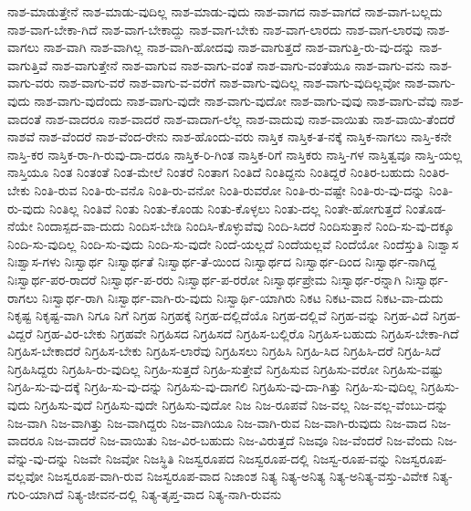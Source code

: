 {ನಾಶ-ಮಾಡುತ್ತೇನೆ
ನಾಶ-ಮಾಡು-ವುದಿಲ್ಲ
ನಾಶ-ಮಾಡು-ವುದು
ನಾಶ-ವಾಗದ
ನಾಶ-ವಾಗದೆ
ನಾಶ-ವಾಗ-ಬಲ್ಲದು
ನಾಶ-ವಾಗ-ಬೇಕಾ-ಗಿದೆ
ನಾಶ-ವಾಗ-ಬೇಕಾದ್ದು
ನಾಶ-ವಾಗ-ಬೇಕು
ನಾಶ-ವಾಗ-ಲಾರದು
ನಾಶ-ವಾಗ-ಲಾರವು
ನಾಶ-ವಾಗಲು
ನಾಶ-ವಾಗಿ
ನಾಶ-ವಾಗಿಲ್ಲ
ನಾಶ-ವಾಗಿ-ಹೋದವು
ನಾಶ-ವಾಗುತ್ತದೆ
ನಾಶ-ವಾಗುತ್ತಿ-ರು-ವು-ದನ್ನು
ನಾಶ-ವಾಗುತ್ತಿವೆ
ನಾಶ-ವಾಗುತ್ತೇನೆ
ನಾಶ-ವಾಗುವ
ನಾಶ-ವಾಗು-ವಂತೆ
ನಾಶ-ವಾಗು-ವಂತೆಯೂ
ನಾಶ-ವಾಗು-ವನು
ನಾಶ-ವಾಗು-ವರು
ನಾಶ-ವಾಗು-ವರೆ
ನಾಶ-ವಾಗು-ವ-ವರೆಗೆ
ನಾಶ-ವಾಗು-ವುದಿಲ್ಲ
ನಾಶ-ವಾಗು-ವುದಿಲ್ಲವೋ
ನಾಶ-ವಾಗು-ವುದು
ನಾಶ-ವಾಗು-ವುದೆಂದು
ನಾಶ-ವಾಗು-ವುದೇ
ನಾಶ-ವಾಗು-ವುದೋ
ನಾಶ-ವಾಗು-ವುವು
ನಾಶ-ವಾಗು-ವೆವು
ನಾಶ-ವಾದಂತೆ
ನಾಶ-ವಾದರೂ
ನಾಶ-ವಾದರೆ
ನಾಶ-ವಾದಾಗ-ಲೆಲ್ಲ
ನಾಶ-ವಾದುವು
ನಾಶ-ವಾಯಿತು
ನಾಶ-ವಾಯಿ-ತೆಂದರೆ
ನಾಶವೆ
ನಾಶ-ವೆಂದರೆ
ನಾಶ-ವೆಂದ-ರೇನು
ನಾಶ-ಹೊಂದು-ವರು
ನಾಸ್ತಿಕ
ನಾಸ್ತಿಕ-ತ-ನಕ್ಕೆ
ನಾಸ್ತಿಕ-ನಾಗಲು
ನಾಸ್ತಿ-ಕನೇ
ನಾಸ್ತಿ-ಕರ
ನಾಸ್ತಿಕ-ರಾ-ಗಿ-ರುವು-ದಾ-ದರೂ
ನಾಸ್ತಿಕ-ರಿ-ಗಿಂತ
ನಾಸ್ತಿಕ-ರಿಗೆ
ನಾಸ್ತಿಕರು
ನಾಸ್ತಿ-ಗಳ
ನಾಸ್ತಿತ್ವವೂ
ನಾಸ್ತಿ-ಯಲ್ಲ
ನಾಸ್ತಿಯೂ
ನಿಂತ
ನಿಂತಂತೆ
ನಿಂತ-ಮೇಲೆ
ನಿಂತರೆ
ನಿಂತಾಗ
ನಿಂತಿದೆ
ನಿಂತಿದ್ದನು
ನಿಂತಿದ್ದರೆ
ನಿಂತಿರ-ಬಹುದು
ನಿಂತಿರ-ಬೇಕು
ನಿಂತಿ-ರುವ
ನಿಂತಿ-ರು-ವನೊ
ನಿಂತಿ-ರು-ವನೋ
ನಿಂತಿ-ರುವರೋ
ನಿಂತಿ-ರು-ವಷ್ಟೇ
ನಿಂತಿ-ರು-ವು-ದನ್ನು
ನಿಂತಿ-ರು-ವುದು
ನಿಂತಿಲ್ಲ
ನಿಂತಿವೆ
ನಿಂತು
ನಿಂತು-ಕೊಂಡು
ನಿಂತು-ಕೊಳ್ಳಲು
ನಿಂತು-ದಲ್ಲ
ನಿಂತೇ-ಹೋಗುತ್ತದೆ
ನಿಂತೊಡ-ನೆಯೇ
ನಿಂದಾಸ್ಪದ-ವಾ-ದುದು
ನಿಂದಿಸ-ಬೇಡಿ
ನಿಂದಿಸಿ-ಕೊಳ್ಳುವೆವು
ನಿಂದಿ-ಸಿದರೆ
ನಿಂದಿಸುತ್ತಾನೆ
ನಿಂದಿ-ಸು-ವು-ದಕ್ಕೂ
ನಿಂದಿ-ಸು-ವುದಿಲ್ಲ
ನಿಂದಿ-ಸು-ವುದು
ನಿಂದಿ-ಸು-ವುದೇ
ನಿಂದೆ-ಯಲ್ಲದೆ
ನಿಂದೆಯಲ್ಲವೆ
ನಿಂದೆಯೋ
ನಿಂದೆಸ್ತುತಿ
ನಿಃಶ್ವಾಸ
ನಿಃಶ್ವಾಸ-ಗಳು
ನಿಃಸ್ವಾರ್ಥ
ನಿಃಸ್ವಾರ್ಥತೆ
ನಿಃಸ್ವಾರ್ಥ-ತೆ-ಯಿಂದ
ನಿಃಸ್ವಾರ್ಥದ
ನಿಃಸ್ವಾರ್ಥ-ದಿಂದ
ನಿಃಸ್ವಾರ್ಥ-ನಾಗಿದ್ದ
ನಿಃಸ್ವಾರ್ಥ-ಪರ-ರಾದರೆ
ನಿಃಸ್ವಾರ್ಥ-ಪ-ರರು
ನಿಃಸ್ವಾರ್ಥ-ಪ-ರರೋ
ನಿಃಸ್ವಾರ್ಥಪ್ರೇಮ
ನಿಃಸ್ವಾರ್ಥ-ರನ್ನಾಗಿ
ನಿಃಸ್ವಾರ್ಥ-ರಾಗಲು
ನಿಃಸ್ವಾರ್ಥ-ರಾಗಿ
ನಿಃಸ್ವಾರ್ಥ-ವಾಗಿ-ರು-ವುದು
ನಿಃಸ್ವಾರ್ಥಿ-ಯಾಗಿರು
ನಿಕಟ
ನಿಕಟ-ವಾದ
ನಿಕಟ-ವಾ-ದುದು
ನಿಕೃಷ್ಟ
ನಿಕೃಷ್ಟ-ವಾಗಿ
ನಿಗೂ
ನಿಗೆ
ನಿಗ್ರಹ
ನಿಗ್ರಹಕ್ಕೆ
ನಿಗ್ರಹ-ದಲ್ಲಿದೆಯೊ
ನಿಗ್ರಹ-ದಲ್ಲಿವೆ
ನಿಗ್ರಹ-ವನ್ನು
ನಿಗ್ರಹ-ವಿದೆ
ನಿಗ್ರಹ-ವಿದ್ದರೆ
ನಿಗ್ರಹ-ವಿರ-ಬೇಕು
ನಿಗ್ರಹವೇ
ನಿಗ್ರಹಿಸದ
ನಿಗ್ರಹಿಸದೆ
ನಿಗ್ರಹಿಸ-ಬಲ್ಲಿರೊ
ನಿಗ್ರಹಿಸ-ಬಹುದು
ನಿಗ್ರಹಿಸ-ಬೇಕಾ-ಗಿದೆ
ನಿಗ್ರಹಿಸ-ಬೇಕಾದರೆ
ನಿಗ್ರಹಿಸ-ಬೇಕು
ನಿಗ್ರಹಿಸ-ಲಾರೆವು
ನಿಗ್ರಹಿಸಲು
ನಿಗ್ರಹಿಸಿ
ನಿಗ್ರಹಿ-ಸಿದ
ನಿಗ್ರಹಿಸಿ-ದರೆ
ನಿಗ್ರಹಿ-ಸಿದೆ
ನಿಗ್ರಹಿಸಿದ್ದರು
ನಿಗ್ರಹಿಸಿ-ರು-ವುದಿಲ್ಲ
ನಿಗ್ರಹಿ-ಸುತ್ತದೆ
ನಿಗ್ರಹಿ-ಸುತ್ತೇವೆ
ನಿಗ್ರಹಿಸುವ
ನಿಗ್ರಹಿಸು-ವರೋ
ನಿಗ್ರಹಿಸು-ವಷ್ಟು
ನಿಗ್ರಹಿ-ಸು-ವು-ದಕ್ಕೆ
ನಿಗ್ರಹಿ-ಸು-ವು-ದನ್ನು
ನಿಗ್ರಹಿಸು-ವು-ದಾಗಲಿ
ನಿಗ್ರಹಿಸು-ವು-ದಾ-ಗಿತ್ತು
ನಿಗ್ರಹಿ-ಸು-ವುದಿಲ್ಲ
ನಿಗ್ರಹಿಸು-ವುದು
ನಿಗ್ರಹಿಸು-ವುದೆ
ನಿಗ್ರಹಿಸು-ವುದೇ
ನಿಗ್ರಹಿಸು-ವುದೋ
ನಿಜ
ನಿಜ-ರೂಪವೆ
ನಿಜ-ವಲ್ಲ
ನಿಜ-ವಲ್ಲ-ವೆಂಬು-ದನ್ನು
ನಿಜ-ವಾಗಿ
ನಿಜ-ವಾಗಿತ್ತು
ನಿಜ-ವಾಗಿದ್ದರು
ನಿಜ-ವಾಗಿಯೂ
ನಿಜ-ವಾಗಿ-ರುವ
ನಿಜ-ವಾಗಿ-ರುವುದು
ನಿಜ-ವಾದ
ನಿಜ-ವಾದರೂ
ನಿಜ-ವಾದರೆ
ನಿಜ-ವಾಯಿತು
ನಿಜ-ವಿರ-ಬಹುದು
ನಿಜ-ವಿರುತ್ತದೆ
ನಿಜವೂ
ನಿಜ-ವೆಂದರೆ
ನಿಜ-ವೆಂದು
ನಿಜ-ವೆನ್ನು-ವು-ದನ್ನು
ನಿಜವೇ
ನಿಜವೋ
ನಿಜಸ್ಥಿತಿ
ನಿಜಸ್ವರೂಪದ
ನಿಜಸ್ವರೂಪ-ದಲ್ಲಿ
ನಿಜಸ್ವ-ರೂಪ-ವನ್ನು
ನಿಜಸ್ವರೂಪ-ವಲ್ಲವೋ
ನಿಜಸ್ವರೂಪ-ವಾಗಿ-ರುವ
ನಿಜಸ್ವರೂಪ-ವಾದ
ನಿಜಾಂಶ
ನಿತ್ಯ
ನಿತ್ಯ-ಅನಿತ್ಯ
ನಿತ್ಯ-ಅನಿತ್ಯ-ವಸ್ತು-ವಿವೇಕ
ನಿತ್ಯ-ಗುರಿ-ಯಾಗಿದೆ
ನಿತ್ಯ-ಜೀವನ-ದಲ್ಲಿ
ನಿತ್ಯ-ತೃಪ್ತ-ವಾದ
ನಿತ್ಯ-ನಾಗಿ-ರುವನು
}
